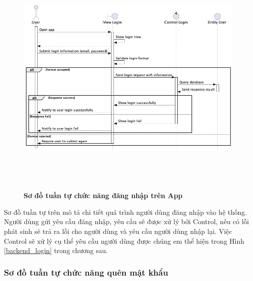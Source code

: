     \begin{figure}[H]
         \centering
         \includegraphics[width=16cm,height=12cm]{Images/mobile_app/login.png}
         \caption[Sơ đồ tuần tự chức năng đăng nhập trên App]{\bfseries \fontsize{12pt}{0pt}
         \selectfont Sơ đồ tuần tự chức năng đăng nhập trên App}
         \label{login} %
    \end{figure}

  Sơ đồ tuần tự trên mô tả chi tiết quá trình người dùng đăng nhập vào hệ thống. Người dùng gửi yêu cầu đăng nhập, yêu cầu sẽ
  được xử lý bởi Control, nếu có lỗi phát sinh sẽ trả ra lỗi cho người dùng và yêu cầu người dùng nhập lại. Việc Control
  sẽ xử lý cụ thể yêu cầu người dùng được chúng em thể hiện trong Hình \ref{backend_login} trong chương sau.

\subsubsection{Sơ đồ tuần tự chức năng quên mật khẩu}

